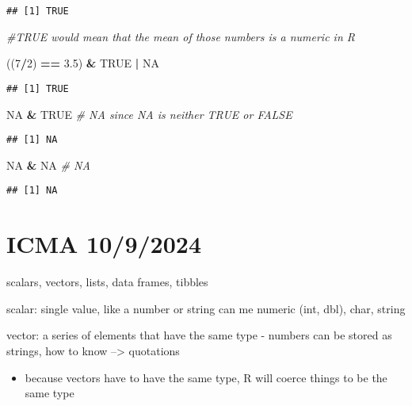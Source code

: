 \documentclass[
]{article}
\newenvironment{Shaded}{\begin{snugshade}}{\end{snugshade}}
\newcommand{\CommentTok}[1]{\textcolor[rgb]{0.56,0.35,0.01}{\textit{#1}}}
\newcommand{\ConstantTok}[1]{\textcolor[rgb]{0.56,0.35,0.01}{#1}}
\newcommand{\DecValTok}[1]{\textcolor[rgb]{0.00,0.00,0.81}{#1}}
\newcommand{\FloatTok}[1]{\textcolor[rgb]{0.00,0.00,0.81}{#1}}
\newcommand{\NormalTok}[1]{#1}
\newcommand{\SpecialCharTok}[1]{\textcolor[rgb]{0.81,0.36,0.00}{\textbf{#1}}}
\providecommand{\tightlist}{%
  \setlength{\itemsep}{0pt}\setlength{\parskip}{0pt}}
\begin{document}
\begin{verbatim}
## [1] TRUE
\end{verbatim}

\begin{Shaded}
\begin{Highlighting}[]
\CommentTok{\#TRUE would mean that the mean of those numbers is a numeric in R}

\NormalTok{((}\DecValTok{7}\SpecialCharTok{/}\DecValTok{2}\NormalTok{) }\SpecialCharTok{==} \FloatTok{3.5}\NormalTok{) }\SpecialCharTok{\&} \ConstantTok{TRUE} \SpecialCharTok{|} \ConstantTok{NA}
\end{Highlighting}
\end{Shaded}

\begin{verbatim}
## [1] TRUE
\end{verbatim}

\begin{Shaded}
\begin{Highlighting}[]
\ConstantTok{NA} \SpecialCharTok{\&} \ConstantTok{TRUE} \CommentTok{\# NA since NA is neither TRUE or FALSE}
\end{Highlighting}
\end{Shaded}

\begin{verbatim}
## [1] NA
\end{verbatim}

\begin{Shaded}
\begin{Highlighting}[]
\ConstantTok{NA} \SpecialCharTok{\&} \ConstantTok{NA} \CommentTok{\# NA}
\end{Highlighting}
\end{Shaded}

\begin{verbatim}
## [1] NA
\end{verbatim}

\section{ICMA 10/9/2024}\label{icma-1092024}

scalars, vectors, lists, data frames, tibbles

scalar: single value, like a number or string can me numeric (int, dbl),
char, string

vector: a series of elements that have the same type - numbers can be
stored as strings, how to know --\textgreater{} quotations

\begin{itemize}
\tightlist
\item
  because vectors have to have the same type, R will coerce things to be
  the same type
\end{itemize}
\end{document}
